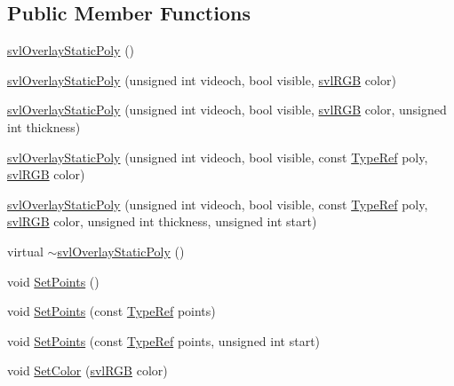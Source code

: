 \subsection*{Public Member Functions}
\begin{DoxyCompactItemize}
\item 
\hyperlink{classsvl_overlay_static_poly_aa13d48357d9b195dcee2decede8df1f4}{svl\-Overlay\-Static\-Poly} ()
\item 
\hyperlink{classsvl_overlay_static_poly_afbb444a8ab7833ad15d5e06fd749af91}{svl\-Overlay\-Static\-Poly} (unsigned int videoch, bool visible, \hyperlink{structsvl_r_g_b}{svl\-R\-G\-B} color)
\item 
\hyperlink{classsvl_overlay_static_poly_a814377b38fbe61886d66e80242767564}{svl\-Overlay\-Static\-Poly} (unsigned int videoch, bool visible, \hyperlink{structsvl_r_g_b}{svl\-R\-G\-B} color, unsigned int thickness)
\item 
\hyperlink{classsvl_overlay_static_poly_abe756bafe2ff6af35dcaa3195efe6908}{svl\-Overlay\-Static\-Poly} (unsigned int videoch, bool visible, const \hyperlink{classsvl_overlay_static_poly_a2d317856c0cec72b3a76252446a85944}{Type\-Ref} poly, \hyperlink{structsvl_r_g_b}{svl\-R\-G\-B} color)
\item 
\hyperlink{classsvl_overlay_static_poly_ad813f1b78670fc599c8e6a40a7574c07}{svl\-Overlay\-Static\-Poly} (unsigned int videoch, bool visible, const \hyperlink{classsvl_overlay_static_poly_a2d317856c0cec72b3a76252446a85944}{Type\-Ref} poly, \hyperlink{structsvl_r_g_b}{svl\-R\-G\-B} color, unsigned int thickness, unsigned int start)
\item 
virtual \hyperlink{classsvl_overlay_static_poly_a8941d61c4367e2f1707b92c5d8040cfb}{$\sim$svl\-Overlay\-Static\-Poly} ()
\item 
void \hyperlink{classsvl_overlay_static_poly_aba2ca2dbf3e0d05cfc178d523b93c7c1}{Set\-Points} ()
\item 
void \hyperlink{classsvl_overlay_static_poly_a7bfbe7094b7ab9f789c4ac08ebd9efef}{Set\-Points} (const \hyperlink{classsvl_overlay_static_poly_a2d317856c0cec72b3a76252446a85944}{Type\-Ref} points)
\item 
void \hyperlink{classsvl_overlay_static_poly_a84671afa45a5523018eab981f70aa60f}{Set\-Points} (const \hyperlink{classsvl_overlay_static_poly_a2d317856c0cec72b3a76252446a85944}{Type\-Ref} points, unsigned int start)
\item 
void \hyperlink{classsvl_overlay_static_poly_abd52aa7bc0015937e7f83c83ad973103}{Set\-Color} (\hyperlink{structsvl_r_g_b}{svl\-R\-G\-B} color)

\end{DoxyCompactItemize}

